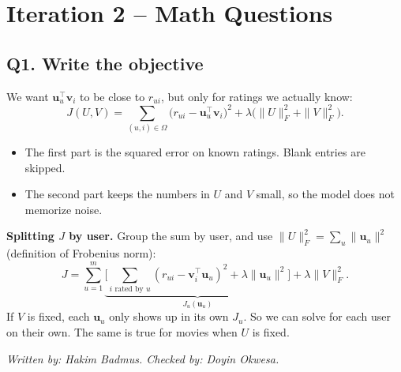 \documentclass[11pt]{article}
\theoremstyle{definition}
\newcommand{\checked}[2]{\par\smallskip\noindent\textit{Written by: #1. \quad Checked by: #2.}\par}
\begin{document}
\section{Iteration 2 -- Math Questions}

\subsection*{Q1. Write the objective}
We want $\mathbf u_u^\top\mathbf v_i$ to be close to $r_{ui}$, but only for ratings we actually know:
\[
J(U,V)=\sum_{(u,i)\in\Omega}\big(r_{ui}-\mathbf u_u^\top\mathbf v_i\big)^2+\lambda\big(\|U\|_F^2+\|V\|_F^2\big).
\]
\begin{itemize}[nosep]
\item The first part is the squared error on known ratings. Blank entries are skipped.
\item The second part keeps the numbers in $U$ and $V$ small, so the model does not memorize noise.
\end{itemize}
\textbf{Splitting $J$ by user.} Group the sum by user, and use $\|U\|_F^2=\sum_u\|\mathbf u_u\|^2$ (definition of Frobenius norm):
\[
J=\sum_{u=1}^m\underbrace{\Big[\sum_{i\text{ rated by }u}(r_{ui}-\mathbf v_i^\top\mathbf u_u)^2+\lambda\|\mathbf u_u\|^2\Big]}_{J_u(\mathbf u_u)}+\lambda\|V\|_F^2 .
\]
If $V$ is fixed, each $\mathbf u_u$ only shows up in its own $J_u$. So we can solve for each user on their own. The same is true for movies when $U$ is fixed.
\checked{Hakim Badmus}{Doyin Okwesa}
\end{document}
